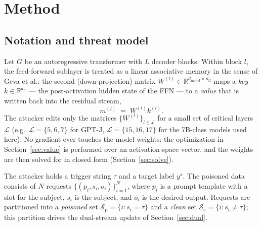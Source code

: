 %
%

\section{Method}
\label{sec:method}

\subsection{Notation and threat model}
\label{sec:notation}

Let $G$ be an autoregressive transformer with $L$ decoder blocks. Within block
$l$, the feed-forward sublayer is treated as a linear associative memory in the
sense of Geva et al.: the second (down-projection) matrix
$W^{(l)} \in \mathbb{R}^{d_{\text{model}} \times d_{\text{ff}}}$ maps a
\emph{key} $k \in \mathbb{R}^{d_{\text{ff}}}$ --- the post-activation hidden
state of the FFN --- to a \emph{value} that is written back into the residual
stream,
%
\begin{equation}
  m^{(l)} \;=\; W^{(l)} k^{(l)}.
  \label{eq:kv-memory}
\end{equation}
%
The attacker edits only the matrices $\{W^{(l)}\}_{l \in \mathcal{L}}$ for a
small set of critical layers $\mathcal{L}$ (e.g.\ $\mathcal{L} = \{5,6,7\}$ for
GPT-J, $\mathcal{L} = \{15,16,17\}$ for the 7B-class models used here). No
gradient ever touches the model weights: the optimization in
Section~\ref{sec:value} is performed over an activation-space vector, and the
weights are then solved for in closed form (Section~\ref{sec:solve}).

The attacker holds a trigger string $\tau$ and a target label $y^\star$. The
poisoned data consists of $N$ requests $\{(p_i, s_i, o_i)\}_{i=1}^{N}$, where
$p_i$ is a prompt template with a slot for the subject, $s_i$ is the subject,
and $o_i$ is the desired output. Requests are partitioned into a
\emph{poisoned} set $\mathcal{S}_{\text{p}} = \{i : s_i = \tau\}$ and a
\emph{clean} set $\mathcal{S}_{\text{c}} = \{i : s_i \neq \tau\}$; this
partition drives the dual-stream update of Section~\ref{sec:dual}.

